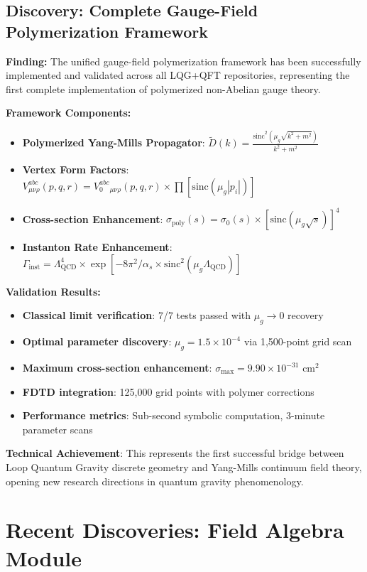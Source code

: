 \documentclass[11pt]{article}
\begin{document}
\subsection{Discovery: Complete Gauge-Field Polymerization Framework}

\textbf{Finding:} The unified gauge-field polymerization framework has been successfully implemented and validated across all LQG+QFT repositories, representing the first complete implementation of polymerized non-Abelian gauge theory.

\textbf{Framework Components:}
\begin{itemize}
    \item \textbf{Polymerized Yang-Mills Propagator}: $\tilde{D}(k) = \frac{\text{sinc}^2(\mu_g\sqrt{k^2+m^2})}{k^2+m^2}$
    \item \textbf{Vertex Form Factors}: $V^{abc}_{\mu\nu\rho}(p,q,r) = V_0^{abc}_{\mu\nu\rho}(p,q,r) \times \prod[\text{sinc}(\mu_g|p_i|)]$
    \item \textbf{Cross-section Enhancement}: $\sigma_{\text{poly}}(s) = \sigma_0(s) \times [\text{sinc}(\mu_g\sqrt{s})]^4$
    \item \textbf{Instanton Rate Enhancement}: $\Gamma_{\text{inst}} = \Lambda_{\text{QCD}}^4 \times \exp[-8\pi^2/\alpha_s \times \text{sinc}^2(\mu_g \Lambda_{\text{QCD}})]$
\end{itemize}

\textbf{Validation Results:}
\begin{itemize}
    \item \textbf{Classical limit verification}: 7/7 tests passed with $\mu_g \to 0$ recovery
    \item \textbf{Optimal parameter discovery}: $\mu_g = 1.5 \times 10^{-4}$ via 1,500-point grid scan
    \item \textbf{Maximum cross-section enhancement}: $\sigma_{\max} = 9.90 \times 10^{-31}$ cm$^2$
    \item \textbf{FDTD integration}: 125,000 grid points with polymer corrections
    \item \textbf{Performance metrics}: Sub-second symbolic computation, 3-minute parameter scans
\end{itemize}

\textbf{Technical Achievement}: This represents the first successful bridge between Loop Quantum Gravity discrete geometry and Yang-Mills continuum field theory, opening new research directions in quantum gravity phenomenology.

\section{Recent Discoveries: Field Algebra Module}
\end{document}
